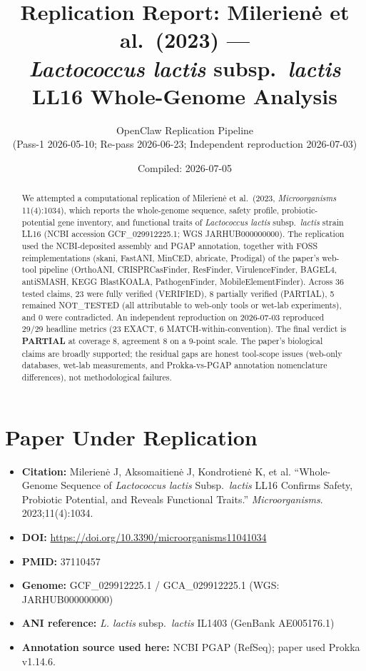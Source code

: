 \documentclass[11pt,letterpaper]{article}
\title{Replication Report: Milerien\.{e} et al.\ (2023) --- \\
\emph{Lactococcus lactis} subsp.\ \emph{lactis} LL16 Whole-Genome Analysis}
\author{OpenClaw Replication Pipeline \\ (Pass-1 2026-05-10; Re-pass 2026-06-23; Independent reproduction 2026-07-03)}
\date{Compiled: 2026-07-05}
\begin{document}
\maketitle

\begin{abstract}
\noindent We attempted a computational replication of Milerien\.{e} et al.\
(2023, \emph{Microorganisms} 11(4):1034), which reports the whole-genome
sequence, safety profile, probiotic-potential gene inventory, and functional
traits of \emph{Lactococcus lactis} subsp.\ \emph{lactis} strain LL16
(NCBI accession GCF\_029912225.1; WGS JARHUB000000000). The replication
used the NCBI-deposited assembly and PGAP annotation, together with
FOSS reimplementations (skani, FastANI, MinCED, abricate, Prodigal) of the
paper's web-tool pipeline (OrthoANI, CRISPRCasFinder, ResFinder,
VirulenceFinder, BAGEL4, antiSMASH, KEGG BlastKOALA, PathogenFinder,
MobileElementFinder). Across 36 tested claims, 23 were fully verified
(VERIFIED), 8 partially verified (PARTIAL), 5 remained NOT\_TESTED
(all attributable to web-only tools or wet-lab experiments), and 0
were contradicted. An independent reproduction on 2026-07-03 reproduced
29/29 headline metrics (23 EXACT, 6 MATCH-within-convention). The final
verdict is \textbf{PARTIAL} at coverage 8, agreement 8 on a 9-point scale.
The paper's biological claims are broadly supported; the residual gaps
are honest tool-scope issues (web-only databases, wet-lab measurements,
and Prokka-vs-PGAP annotation nomenclature differences), not
methodological failures.
\end{abstract}

\section{Paper Under Replication}
\begin{itemize}[leftmargin=1.4em]
\item \textbf{Citation:} Milerien\.{e} J, Aksomaitien\.{e} J, Kondrotien\.{e} K,
et al. ``Whole-Genome Sequence of \emph{Lactococcus lactis} Subsp.\
\emph{lactis} LL16 Confirms Safety, Probiotic Potential, and Reveals
Functional Traits.'' \emph{Microorganisms}. 2023;11(4):1034.
\item \textbf{DOI:} \url{https://doi.org/10.3390/microorganisms11041034}
\item \textbf{PMID:} 37110457
\item \textbf{Genome:} GCF\_029912225.1 / GCA\_029912225.1 (WGS: JARHUB000000000)
\item \textbf{ANI reference:} \emph{L. lactis} subsp.\ \emph{lactis} IL1403 (GenBank AE005176.1)
\item \textbf{Annotation source used here:} NCBI PGAP (RefSeq); paper used Prokka v1.14.6.
\end{itemize}
\end{document}

